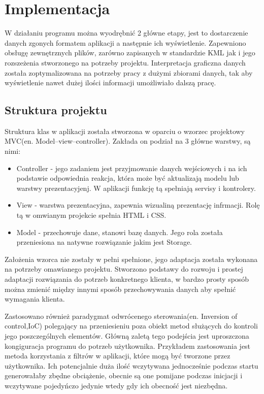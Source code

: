 ﻿\chapter{Implementacja}
\label{cha:implementacja}

W działaniu programu można wyodrębnić 2 główne etapy, jest to dostarczenie danych zgonych formatem aplikacji a następnie ich wyświetlenie. Zapewniono obsługę zewnętrznych plików, zarówno zapisanych w standardzie KML jak i jego rozszeżenia stworzonego na potrzeby projektu. Interpretacja graficzna danych została zoptymalizowana na potrzeby pracy z dużymi zbiorami danych, tak aby wyświetlenie nawet dużej ilości informacji umożliwiało dalszą pracę.


\section{Struktura projektu}
\label{sec:structure}

Struktura klas w aplikacji została stworzona w oparciu o wzorzec projektowy MVC(en. Model–view–controller). Zakłada on podział na 3 główne warstwy, są nimi:

\begin{itemize}
\item
Controller - jego zadaniem jest przyjmowanie danych wejściowych i na ich podstawie odpowiednia reakcja, która może być aktualizają modelu lub warstwy prezentacyjenj.  W aplikacji funkcję tą spełniają servisy i kontrolery.
\item
View - warstwa prezentacyjna, zapewnia wizualiną prezentację infrmacji. Rolę tą w omwianym projekcie spełnia HTML i CSS.
\item
Model - przechowuje dane, stanowi bazę danych. Jego rola została przeniesiona na natywne rozwiązanie jakim jest Storage.
\end{itemize}

Założenia wzorca nie zostały w pełni spełnione, jego adaptacja została wykonana na potrzeby omawianego projektu. Stworzono podstawy do rozwoju i prostej adaptacji rozwiązania do potrzeb konkretnego klienta, w bardzo prosty sposób można zmienić między innymi sposób przechowywania danych aby spełnić wymagania klienta.


Zastosowano również paradygmat odwrócenego sterowania(en. Inversion of control,IoC) polegający na przeniesieniu poza obiekt metod służących do kontroli jego poszczególnych elementów. Główną zaletą tego podejścia jest uproszczona kongiguracja programu do potrzeb użytkownika. Przykładem zastosowania jest metoda korzystania z filtrów w aplikacji, które mogą być tworzone przez użytkownika. Ich potencjalnie duża ilość wczytywana jednocześnie podczas startu generowałaby zbędne obciążenie, obecnie są one pomijane podczas inicjacji i wczytywane pojedyńczo jedynie wtedy gdy ich obecność jest niezbędna.


